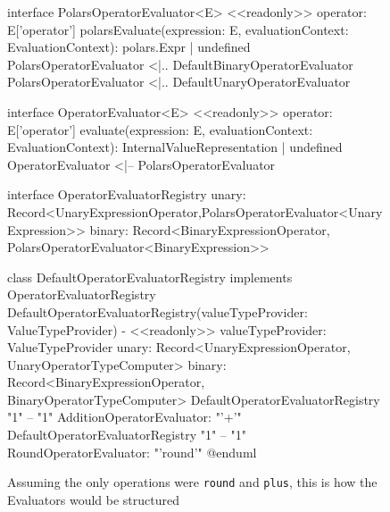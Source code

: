 \begin{figure}
\begin{plantuml}
		interface PolarsOperatorEvaluator<E> {
				<<readonly>> operator: E['operator']
				polarsEvaluate(expression: E, evaluationContext: EvaluationContext): polars.Expr | undefined
			}
		PolarsOperatorEvaluator <|.. DefaultBinaryOperatorEvaluator
		PolarsOperatorEvaluator <|.. DefaultUnaryOperatorEvaluator

		interface OperatorEvaluator<E> {
				<<readonly>> operator: E['operator']
				evaluate(expression: E, evaluationContext: EvaluationContext): InternalValueRepresentation | undefined
			}
		OperatorEvaluator <|-- PolarsOperatorEvaluator

		interface OperatorEvaluatorRegistry {
				unary: Record<UnaryExpressionOperator,PolarsOperatorEvaluator<UnaryExpression>>
				binary: Record<BinaryExpressionOperator, PolarsOperatorEvaluator<BinaryExpression>>
			}

		class DefaultOperatorEvaluatorRegistry implements OperatorEvaluatorRegistry {
				DefaultOperatorEvaluatorRegistry(valueTypeProvider: ValueTypeProvider)
				- <<readonly>> valueTypeProvider: ValueTypeProvider
				unary: Record<UnaryExpressionOperator, UnaryOperatorTypeComputer>
				binary: Record<BinaryExpressionOperator, BinaryOperatorTypeComputer>
			}
		DefaultOperatorEvaluatorRegistry "1" -- "1" AdditionOperatorEvaluator: "'+'"
		DefaultOperatorEvaluatorRegistry "1" -- "1" RoundOperatorEvaluator: "'round'"
		@enduml
	\end{plantuml}
	\caption{Assuming the only operations were \Verb|round| and \Verb|plus|, this is how the Evaluators would be structured}
	\label{fig:uml:evaluators}
\end{figure}
